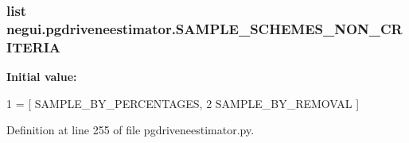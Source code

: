 \subsubsection[{\texorpdfstring{S\+A\+M\+P\+L\+E\+\_\+\+S\+C\+H\+E\+M\+E\+S\+\_\+\+N\+O\+N\+\_\+\+C\+R\+I\+T\+E\+R\+IA}{SAMPLE_SCHEMES_NON_CRITERIA}}]{\setlength{\rightskip}{0pt plus 5cm}list negui.\+pgdriveneestimator.\+S\+A\+M\+P\+L\+E\+\_\+\+S\+C\+H\+E\+M\+E\+S\+\_\+\+N\+O\+N\+\_\+\+C\+R\+I\+T\+E\+R\+IA}\hypertarget{namespacenegui_1_1pgdriveneestimator_a2d9d6cbe867f7222f090e8fa43d5c04d}{}\label{namespacenegui_1_1pgdriveneestimator_a2d9d6cbe867f7222f090e8fa43d5c04d}
{\bfseries Initial value\+:}
\begin{DoxyCode}
1 = [ SAMPLE\_BY\_PERCENTAGES, 
2                                     SAMPLE\_BY\_REMOVAL ]
\end{DoxyCode}


Definition at line 255 of file pgdriveneestimator.\+py.

